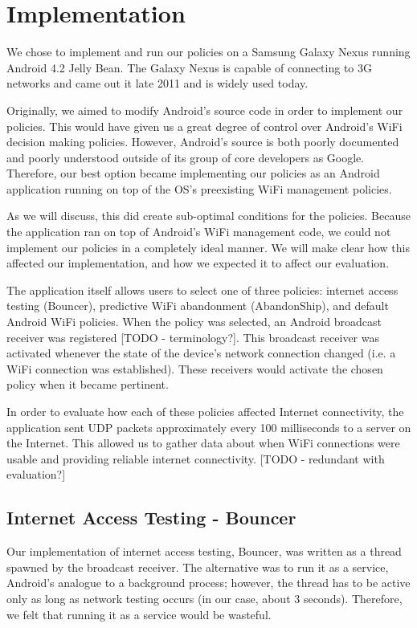 \section{Implementation}
\label{sec:impl}

We chose to implement and run our policies on a Samsung Galaxy Nexus running Android 4.2 Jelly Bean. The Galaxy Nexus is capable of connecting to 3G networks and came out it late 2011 and is widely used today.

Originally, we aimed to modify Android's source code in order to implement our policies. This would have given us a great degree of control over Android's WiFi decision making policies. However, Android's source is both poorly documented and poorly understood outside of its group of core developers as Google. Therefore, our best option became implementing our policies as an Android application running on top of the OS's preexisting WiFi management policies.

As we will discuss, this did create sub-optimal conditions for the policies. Because the application ran on top of Android's WiFi management code, we could not implement our policies in a completely ideal manner. We will make clear how this affected our implementation, and how we expected it to affect our evaluation.

The application itself allows users to select one of three policies: internet access testing (Bouncer), predictive WiFi abandonment (AbandonShip), and default Android WiFi policies. When the policy was selected, an Android broadcast receiver was registered [TODO - terminology?]. This broadcast receiver was activated whenever the state of the device's network connection changed (i.e. a WiFi connection was established). These receivers would activate the chosen policy when it became pertinent.

In order to evaluate how each of these policies affected Internet connectivity, the application sent UDP packets approximately every 100 milliseconds to a server on the Internet. This allowed us to gather data about when WiFi connections were usable and providing reliable internet connectivity. [TODO - redundant with evaluation?]

\subsection{Internet Access Testing - Bouncer}
Our implementation of internet access testing, Bouncer, was written as a thread spawned by the broadcast receiver. The alternative was to run it as a service, Android's analogue to a background process; however, the thread has to be active only as long as network testing occurs (in our case, about 3 seconds). Therefore, we felt that running it as a service would be wasteful.

